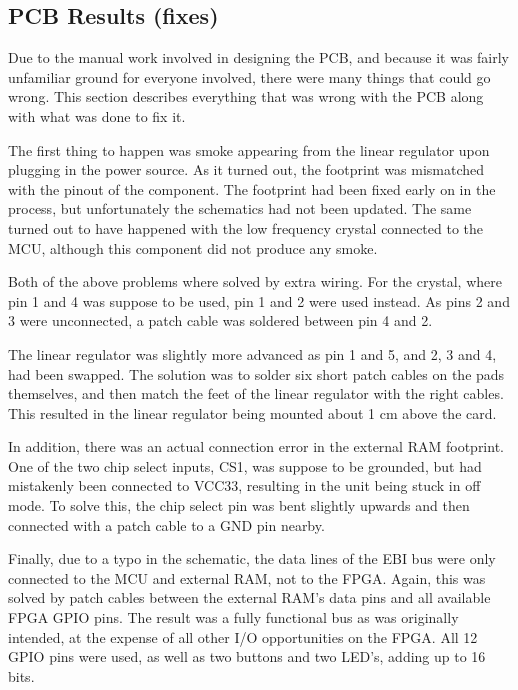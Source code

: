 
\subsection{PCB Results (fixes)}

Due to the manual work involved in designing the PCB, and because it was fairly
unfamiliar ground for everyone involved, there were many things that could go
wrong. This section describes everything that was wrong with the PCB along with
what was done to fix it.

The first thing to happen was smoke appearing from the linear regulator upon
plugging in the power source. As it turned out, the footprint was mismatched
with the pinout of the component. The footprint had been fixed early on in the
process, but unfortunately the schematics had not been updated. The same turned
out to have happened with the low frequency crystal connected to the MCU,
although this component did not produce any smoke.

Both of the above problems where solved by extra wiring. For the crystal, where
pin 1 and 4 was suppose to be used, pin 1 and 2 were used instead. As pins 2 and
3 were unconnected, a patch cable was soldered between pin 4 and 2.

The linear regulator was slightly more advanced as pin 1 and 5, and 2, 3 and 4,
had been swapped. The solution was to solder six short patch cables on the pads
themselves, and then match the feet of the linear regulator with the right
cables. This resulted in the linear regulator being mounted about 1 cm above the
card.




In addition, there was an actual connection error in the external RAM footprint.
One of the two chip select inputs, CS1, was suppose to be grounded, but had
mistakenly been connected to VCC33, resulting in the unit being stuck in off
mode. To solve this, the chip select pin was bent slightly upwards and then
connected with a patch cable to a GND pin nearby. 

Finally, due to a typo in the schematic, the data lines of the EBI bus were only
connected to the MCU and external RAM, not to the FPGA. Again, this was solved
by patch cables between the external RAM's data pins and all available FPGA GPIO
pins. The result was a fully functional bus as was originally intended, at the
expense of all other I/O opportunities on the FPGA. All 12 GPIO pins were used,
as well as two buttons and two LED's, adding up to 16 bits.
